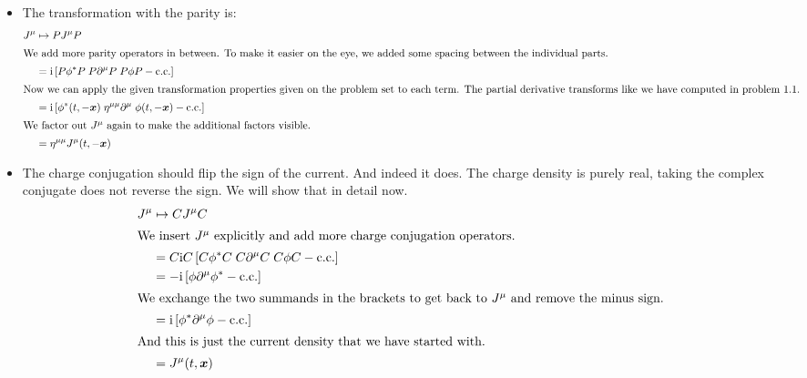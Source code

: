 \documentclass[11pt, english, fleqn, DIV=15, headinclude, BCOR=1cm]{scrartcl}
\begin{document}
\begin{itemize}
    \item
        The transformation with the parity is:
        \begin{align*}
            J^\mu
            &\mapsto P J^\mu P \\
            \intertext{%
                We add more parity operators in between. To make it easier on
                the eye, we added some spacing between the individual parts.
            }
            &= \iup \sbr{P \phi^* P \; P \partial^\mu P \; P \phi P - \cc} \\
            \intertext{%
                Now we can apply the given transformation properties given on
                the problem set to each term. The partial derivative transforms
                like we have computed in problem 1.1.
            }
            &= \iup \sbr{\phi^*(t, -\vec x) \; \eta^{\mu\mu} \partial^\mu \;
            \phi(t, -\vec x) - \cc} \\
            \intertext{%
                We factor out $J^\mu$ again to make the additional factors
                visible.
            }
            &= \eta^{\mu\mu} J^\mu(t, -\vec x)
        \end{align*}

    \item
        The charge conjugation should flip the sign of the current. And indeed
        it does. The charge density is purely real, taking the complex
        conjugate does not reverse the sign. We will show that in detail now.
        \begin{align*}
            J^\mu
            &\mapsto C J^\mu C \\
            \intertext{%
                We insert $J^\mu$ explicitly and add more charge conjugation
                operators.
            }
            &= C \iup C \sbr{C \phi^* C \; C \partial^\mu C \; C \phi C - \cc} \\
            &= - \iup \sbr{\phi \partial^\mu \phi^* - \cc} \\
            \intertext{%
                We exchange the two summands in the brackets to get back to
                $J^\mu$ and remove the minus sign.
            }
            &= \iup \sbr{\phi^* \partial^\mu \phi - \cc} \\
            \intertext{%
                And this is just the current density that we have started with.
            }
            &= J^\mu(t, \vec x)
        \end{align*}


\end{itemize}
\end{document}
